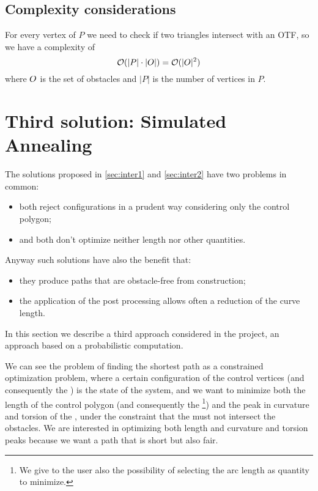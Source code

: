 \documentclass[dissertation.tex]{subfiles}
\begin{document}
\subsection{Complexity considerations}
For every vertex of $P$ we need to check if two triangles intersect
with an \ac{OTF}, so we have a complexity of
\begin{equation*}
  \mathcal{O}(|P|\cdot|O|)=\mathcal{O}(|O|^2)
\end{equation*}
where $O$ is the set of obstacles and $|P|$ is the number of vertices
in $P$.

\section{Third solution: Simulated Annealing}\label{sec:inter3}
The solutions proposed in \cref{sec:inter1} and \cref{sec:inter2} have two
problems in common:
\begin{itemize}
\item both reject configurations in a prudent way
  considering only the control polygon;
\item and both don't optimize neither
  length nor other quantities.
\end{itemize}
Anyway such solutions have also the benefit that:
\begin{itemize}
\item they produce paths that are obstacle-free from construction;
\item the application of the post processing allows often a reduction
  of the curve length.
\end{itemize}

In this section we describe a third
approach considered in the project, an approach based on a
probabilistic computation.
    
We can see the problem of finding the shortest path as a constrained
optimization problem, where a certain configuration of the control
vertices (and
consequently the \bs) is the state of the system, and we want to
minimize both the length of the control polygon (and consequently the
\bs\footnote{We give to the user also the possibility of selecting the
  arc length as quantity to minimize.}) and the peak in curvature and torsion of the \bs, under
the constraint that the \bs must not intersect the obstacles. We
are interested in optimizing both length and curvature and torsion
peaks because we want a path that is short but also fair.
\end{document}

